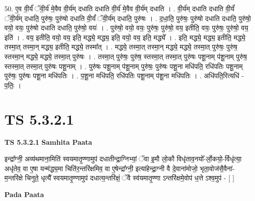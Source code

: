 \documentclass[17pt]{extarticle}
\begin{document}
50. ए॒व वी॒र्यं॑ ॅवी॒र्य॑ मे॒वैव वी॒र्य॑म् दधाति दधाति वी॒र्य॑ मे॒वैव वी॒र्य॑म् दधाति । . वी॒र्य॑म् दधाति दधाति वी॒र्यं॑ ॅवी॒र्य॑म् दधाति॒ पुरु॑षः॒ पुरु॑षो दधाति वी॒र्यं॑ ॅवी॒र्य॑म् दधाति॒ पुरु॑षः । . द॒धा॒ति॒ पुरु॑षः॒ पुरु॑षो दधाति दधाति॒ पुरु॑षो॒ वयो॒ वयः॒ पुरु॑षो दधाति दधाति॒ पुरु॑षो॒ वयः॑ । . पुरु॑षो॒ वयो॒ वयः॒ पुरु॑षः॒ पुरु॑षो॒ वय॒ इतीति॒ वयः॒ पुरु॑षः॒ पुरु॑षो॒ वय॒ इति॑ । . वय॒ इतीति॒ वयो॒ वय॒ इति॒ मद्ध्ये॒ मद्ध्य॒ इति॒ वयो॒ वय॒ इति॒ मद्ध्ये᳚ । . इति॒ मद्ध्ये॒ मद्ध्य॒ इतीति॒ मद्ध्ये॒ तस्मा॒त् तस्मा॒न् मद्ध्य॒ इतीति॒ मद्ध्ये॒ तस्मा᳚त् । . मद्ध्ये॒ तस्मा॒त् तस्मा॒न् मद्ध्ये॒ मद्ध्ये॒ तस्मा॒त् पुरु॑षः॒ पुरु॑ष॒ स्तस्मा॒न् मद्ध्ये॒ मद्ध्ये॒ तस्मा॒त् पुरु॑षः । . तस्मा॒त् पुरु॑षः॒ पुरु॑ष॒ स्तस्मा॒त् तस्मा॒त् पुरु॑षः पशू॒नाम् प॑शू॒नाम् पुरु॑ष॒ स्तस्मा॒त् तस्मा॒त् पुरु॑षः पशू॒नाम् । . पुरु॑षः पशू॒नाम् प॑शू॒नाम् पुरु॑षः॒ पुरु॑षः पशू॒ना मधि॑पति॒ रधि॑पतिः पशू॒नाम् पुरु॑षः॒ पुरु॑षः पशू॒ना मधि॑पतिः । . प॒शू॒ना मधि॑पति॒ रधि॑पतिः पशू॒नाम् प॑शू॒ना मधि॑पतिः । . अधि॑पति॒रित्यधि॑ - प॒तिः॒ । \newline
\pagebreak
{}

\section{ TS 5.3.2.1 }

\textbf{TS 5.3.2.1 } \newline
\textbf{Samhita Paata} \newline

इन्द्रा᳚ग्नी॒ अव्य॑थमाना॒मिति॑ स्वयमातृ॒ण्णामुप॑ दधातीन्द्रा॒ग्निभ्यां॒ ॅवा इ॒मौ लो॒कौ विधृ॑ताव॒नयो᳚-र्लो॒कयो॒-र्विधृ॑त्या॒ अधृ॑तेव॒ वा ए॒षा यन्म॑द्ध्य॒मा चिति॑र॒न्तरि॑क्षमिव॒ वा ए॒षेन्द्रा᳚ग्नी॒ इत्या॑हेन्द्रा॒ग्नी वै दे॒वाना॑मोजो॒ भृता॒वोज॑सै॒वैना॑-म॒न्तरि॑क्षे चिनुते॒ धृत्यै᳚ स्वयमातृ॒ण्णामुप॑ दधात्य॒न्तरि॑क्षं॒ ॅवै स्व॑यमातृ॒ण्णा ऽन्तरि॑क्षमे॒वोप॑ ध॒त्ते ऽश्व॒मुप॑ - [  ] \newline

\textbf{Pada Paata} \newline
\end{document}
